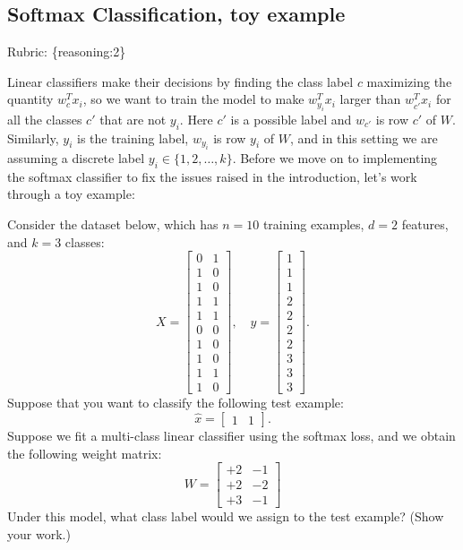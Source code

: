 \documentclass{article}
\def\rubric#1{\gre{Rubric: \{#1\}}}{}
\def\blu#1{{\color{blu}#1}}
\def\gre#1{{\color{gre}#1}}
\begin{document}
\subsection{Softmax Classification, toy example}
\rubric{reasoning:2}

Linear classifiers make their decisions by finding the class label $c$ maximizing the quantity $w_c^Tx_i$, so we want to train the model to make $w_{y_i}^Tx_i$ larger than $w_{c'}^Tx_i$ for all the classes $c'$ that are not $y_i$.
Here $c'$ is a possible label and $w_{c'}$ is row $c'$ of $W$. Similarly, $y_i$ is the training label, $w_{y_i}$ is row $y_i$ of $W$, and in this setting we are assuming a discrete label $y_i \in \{1,2,\dots,k\}$. Before we move on to implementing the softmax classifier to fix the issues raised in the introduction, let's work through a toy example:

Consider the dataset below, which has $n=10$ training examples, $d=2$ features, and $k=3$ classes:
\[
X = \begin{bmatrix}0 & 1\\1 & 0\\ 1 & 0\\ 1 & 1\\ 1 & 1\\ 0 & 0\\  1 & 0\\  1 & 0\\  1 & 1\\  1 &0\end{bmatrix}, \quad y = \begin{bmatrix}1\\1\\1\\2\\2\\2\\2\\3\\3\\3\end{bmatrix}.
\]
Suppose that you want to classify the following test example:
\[
\hat{x} = \begin{bmatrix}1 & 1\end{bmatrix}.
\]
Suppose we fit a multi-class linear classifier using the softmax loss, and we obtain the following weight matrix:
\[
W =
\begin{bmatrix}
+2 & -1\\
+2 & -2\\
+3 & -1
\end{bmatrix}
\]
\blu{Under this model, what class label would we assign to the test example? (Show your work.)}
\end{document}
